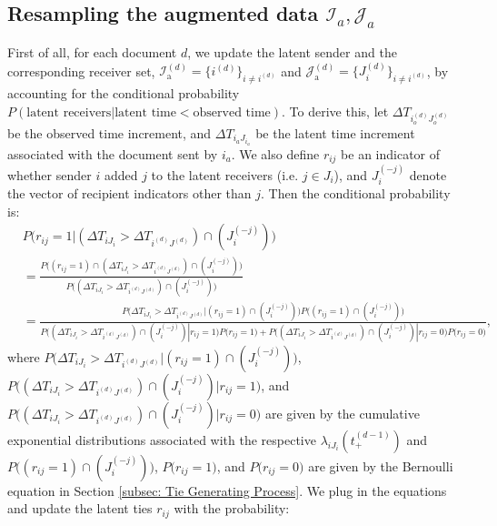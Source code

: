 \documentclass[a4paper]{article}
\begin{document}
   \subsection{Resampling the augmented data $\mathcal{I}_a, \mathcal{J}_a$}
   First of all, for each document $d$, we update the latent sender and the corresponding receiver set,  $\mathcal{I}^{(d)}_{\mbox{a}}=\{i^{(d)}\}_{i\neq i^{(d)}}$ and  $\mathcal{J}^{(d)}_{\mbox{a}}=\{J_i^{(d)}\}_{i\neq i^{(d)}}$, by accounting for the conditional probability $P(\mbox{latent receivers}| \mbox{latent time} < \mbox{observed time})$. To derive this, let $\Delta T_{i_o^{(d)}{J_o^{(d)}}}$ be the observed time increment, and $\Delta T_{i_a{J_{i_a}}}$ be the latent time increment associated with the document sent by $i_a$. We also define $r_{ij}$ be an indicator of whether sender $i$ added $j$ to the latent receivers (i.e. $j \in J_i$), and $J_i^{(-j)}$ denote the vector of recipient indicators other than $j$. Then the conditional probability is:\\
   \begin{equation}
   	\begin{split}
   		&P\Big(r_{ij}=1|(\Delta T_{i{J_i}} > \Delta T_{i^{(d)}{J^{(d)}}})\cap( J_i^{(-j)})\Big)\\ &=\frac{P\Big((r_{ij}=1)\cap (\Delta T_{i{J_i}} > \Delta T_{i^{(d)}{J^{(d)}}})\cap (J_i^{(-j)})\Big)}{P\Big((\Delta T_{i{J_i}} > \Delta T_{i^{(d)}{J^{(d)}}})\cap (J_i^{(-j)})\Big)}\\
   		& = \frac{P\Big(\Delta T_{i{J_i}} > \Delta T_{i^{(d)}{J^{(d)}}} | (r_{ij}=1)\cap (J_i^{(-j)})\Big)P\Big((r_{ij}=1) \cap (J_i^{(-j)})\Big)}{P\Big((\Delta T_{i{J_i}} > \Delta T_{i^{(d)}{J^{(d)}}})\cap (J_i^{(-j)})|r_{ij}=1\Big)P\Big(r_{ij}=1\Big)+P\Big( (\Delta T_{i{J_i}} > \Delta T_{i^{(d)}{J^{(d)}}}) \cap (J_i^{(-j)})|r_{ij}=0\Big)P\Big(r_{ij}=0\Big)},
   	\end{split}
   \end{equation}
   where $P\Big(\Delta T_{i{J_i}} > \Delta T_{i^{(d)}{J^{(d)}}} | (r_{ij}=1)\cap (J_i^{(-j)})\Big)$, $P\Big((\Delta T_{i{J_i}}> \Delta T_{i^{(d)}{J^{(d)}}})\cap (J_i^{(-j)})|r_{ij}=1\Big)$, and $P\Big((\Delta T_{i{J_i}}> \Delta T_{i^{(d)}{J^{(d)}}})\cap (J_i^{(-j)})|r_{ij}=0\Big)$ are given by the cumulative exponential distributions associated with the respective $\lambda_{iJ_i}(t_+^{(d-1)})$ and $P\Big((r_{ij}=1) \cap (J_i^{(-j)})\Big)$,  $P\Big(r_{ij}=1\Big)$, and $P\Big(r_{ij}=0\Big)$ are given by the Bernoulli equation in Section \ref{subsec: Tie Generating Process}. We plug in the equations and update the latent ties $r_{ij}$ with the probability:
\end{document}
